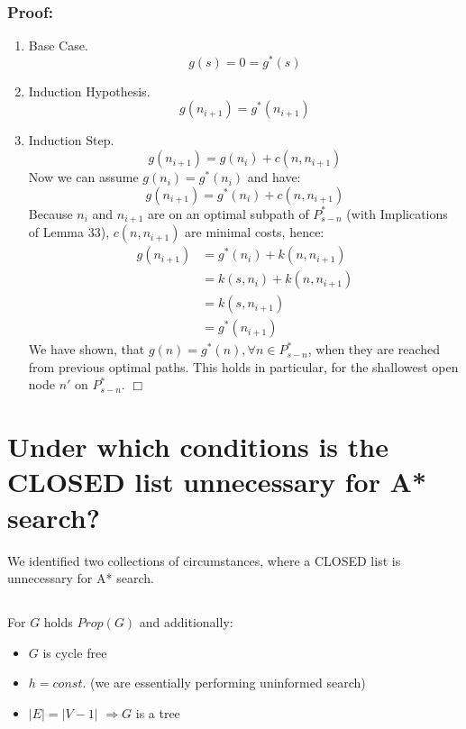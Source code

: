 \documentclass[11pt]{article}
\begin{document}
\subsubsection*{Proof:}
\begin{enumerate}
\item Base Case.
\begin{equation*}
g(s)=0=g^*(s)
\end{equation*}

\item Induction Hypothesis.
\begin{equation*}
g(n_{i+1})=g^*(n_{i+1})
\end{equation*}

\item Induction Step.
\begin{equation*}
g(n_{i+1})=g(n_i)+ c(n,n_{i+1}) 
\end{equation*}
 Now we can assume $
g(n_i)=g^*(n_i)$ and have:
\begin{equation*}
g(n_{i+1})=g^*(n_i)+ c(n,n_{i+1})\end{equation*}
Because $n_i$ and $n_{i+1}$ are on an optimal subpath of $P^*_{s-n}$ (with Implications of Lemma 33), $c(n,n_{i+1})$ are minimal costs, hence:
\begin{align*}
g(n_{i+1})&=g^*(n_i)+k(n,n_{i+1})\\
&=k(s,n_i)+k(n,n_{i+1})\\
&=k(s,n_{i+1})\\
&=g^*(n_{i+1})
\end{align*}
We have shown, that $g(n)=g^*(n), \forall n \in P^*_{s-n}$, when they are reached from previous optimal paths. This holds in particular, for the shallowest open node $n'$ on $P^*_{s-n}$.
\hfill $\Box$
\end{enumerate}

\section{Under which conditions is the CLOSED list unnecessary for A* search?}
We identified two collections of circumstances, where a CLOSED list is unnecessary for A* search.
\subsection{}

For $G$ holds $Prop(G)$ and additionally:
\begin{itemize}
\item $G$ is cycle free
\item $h=const.$ (we are essentially performing uninformed search)
\item $|E|=|V-1|$ \quad $\Rightarrow G$ is a tree
\end{itemize}
\end{document}

